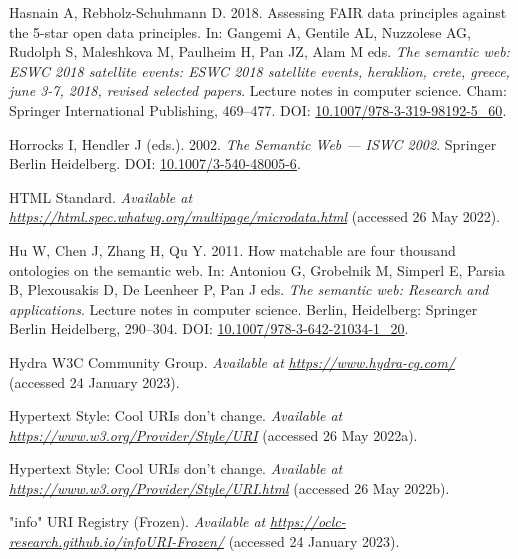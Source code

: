 \begin{CSLReferences}{1}{0}
\leavevmode{}%
Hasnain A, Rebholz-Schuhmann D. 2018. Assessing FAIR data principles against the 5-star open data principles. In: Gangemi A, Gentile AL, Nuzzolese AG, Rudolph S, Maleshkova M, Paulheim H, Pan JZ, Alam M eds. \emph{The semantic web: ESWC 2018 satellite events: ESWC 2018 satellite events, heraklion, crete, greece, june 3-7, 2018, revised selected papers}. Lecture notes in computer science. Cham: Springer International Publishing, 469--477. DOI: \href{https://doi.org/10.1007/978-3-319-98192-5_60}{10.1007/978-3-319-98192-5\_60}.

\leavevmode{}%
Horrocks I, Hendler J (eds.). 2002. \emph{The Semantic Web --- ISWC 2002}. Springer Berlin Heidelberg. DOI: \href{https://doi.org/10.1007/3-540-48005-6}{10.1007/3-540-48005-6}.

\leavevmode{}%
HTML Standard. \emph{Available at} \href{https://html.spec.whatwg.org/multipage/microdata.html}{\emph{https://html.spec.whatwg.org/multipage/microdata.html}} (accessed 26 May 2022).

\leavevmode{}%
Hu W, Chen J, Zhang H, Qu Y. 2011. How matchable are four thousand ontologies on the semantic web. In: Antoniou G, Grobelnik M, Simperl E, Parsia B, Plexousakis D, De Leenheer P, Pan J eds. \emph{The semantic web: Research and applications}. Lecture notes in computer science. Berlin, Heidelberg: Springer Berlin Heidelberg, 290--304. DOI: \href{https://doi.org/10.1007/978-3-642-21034-1_20}{10.1007/978-3-642-21034-1\_20}.

\leavevmode{}%
Hydra W3C Community Group. \emph{Available at} \href{https://www.hydra-cg.com/}{\emph{https://www.hydra-cg.com/}} (accessed 24 January 2023).

\leavevmode{}%
Hypertext Style: Cool URIs don't change. \emph{Available at} \href{https://www.w3.org/Provider/Style/URI}{\emph{https://www.w3.org/Provider/Style/URI}} (accessed 26 May 2022a).

\leavevmode{}%
Hypertext Style: Cool URIs don't change. \emph{Available at} \href{https://www.w3.org/Provider/Style/URI.html}{\emph{https://www.w3.org/Provider/Style/URI.html}} (accessed 26 May 2022b).

\leavevmode{}%
"info" URI Registry (Frozen). \emph{Available at} \href{https://oclc-research.github.io/infoURI-Frozen/}{\emph{https://oclc-research.github.io/infoURI-Frozen/}} (accessed 24 January 2023).


\end{CSLReferences}
